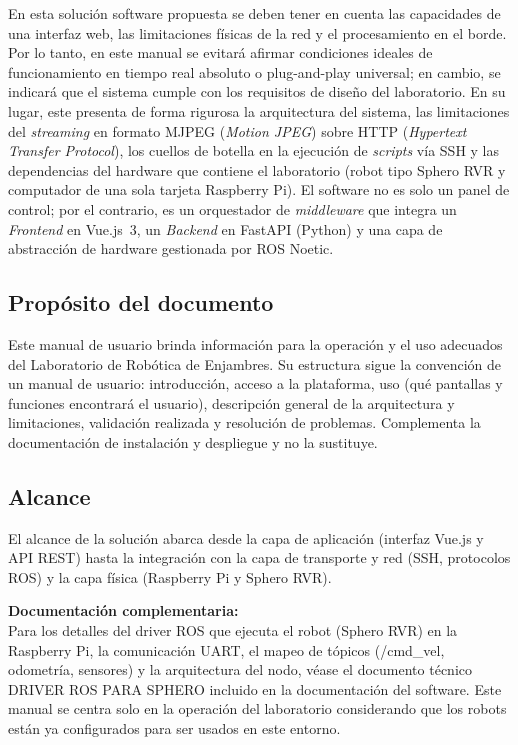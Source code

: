 \documentclass[12pt]{article}
\numberwithin{figure}{section}
\numberwithin{table}{section}
\def\code#1{#1}%
\newcommand{\code}[1]{\textcolor{codeblue}{\url{#1}}}
\begin{document}
En esta solución software propuesta se deben tener en cuenta las capacidades de una interfaz web, las limitaciones físicas de la red y el procesamiento en el borde. Por lo tanto, en este manual se evitará afirmar condiciones ideales de funcionamiento en tiempo real absoluto o plug-and-play universal; en cambio, se indicará que el sistema cumple con los requisitos de diseño del laboratorio. En su lugar, este presenta de forma rigurosa la arquitectura del sistema, las limitaciones del \textit{streaming} en formato MJPEG (\textit{Motion JPEG}) sobre HTTP (\textit{Hypertext Transfer Protocol}), los cuellos de botella en la ejecución de \textit{scripts} vía SSH y las dependencias del hardware que contiene el laboratorio (robot tipo Sphero RVR y computador de una sola tarjeta Raspberry Pi). El software no es solo un panel de control; por el contrario, es un orquestador de \textit{middleware} que integra un \textit{Frontend} en Vue.js~3, un \textit{Backend} en FastAPI (Python) y una capa de abstracción de hardware gestionada por ROS Noetic.


\subsection{Propósito del documento}

Este manual de usuario brinda información para la operación y el uso adecuados del Laboratorio de Robótica de Enjambres. Su estructura sigue la convención de un manual de usuario: introducción, acceso a la plataforma, uso (qué pantallas y funciones encontrará el usuario), descripción general de la arquitectura y limitaciones, validación realizada y resolución de problemas. Complementa la documentación de instalación y despliegue y no la sustituye.


\subsection{Alcance}

El alcance de la solución abarca desde la capa de aplicación (interfaz Vue.js y API REST) hasta la integración con la capa de transporte y red (SSH, protocolos ROS) y la capa física (Raspberry Pi y Sphero RVR).

\begin{tipbox}
\textbf{Documentación complementaria:}\\
Para los detalles del driver ROS que ejecuta el robot (Sphero RVR) en la Raspberry Pi, la comunicación UART, el mapeo de tópicos (\code{/cmd\_vel}, odometría, sensores) y la arquitectura del nodo, véase el documento técnico DRIVER ROS PARA SPHERO incluido en la documentación del software. Este manual se centra solo en la operación del laboratorio considerando que los robots están ya configurados para ser usados en este entorno.
\end{tipbox}
\end{document}
